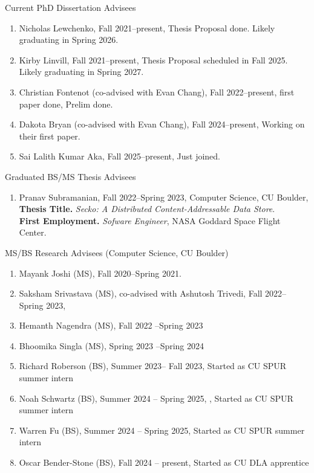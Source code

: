 \documentclass{article}
\begin{document}
\vspace{1em}
\noindent Current PhD Dissertation Advisees 
\begin{enumerate}
  \item Nicholas Lewchenko, Fall 2021--present, Thesis Proposal done. Likely graduating in Spring 2026.
  \item Kirby Linvill, Fall 2021--present, Thesis Proposal scheduled in
  Fall 2025. Likely graduating in Spring 2027. 
  \item Christian Fontenot (co-advised with Evan Chang), Fall 2022–present,
  first paper done, Prelim done. 
  \item Dakota Bryan (co-advised with Evan Chang), Fall 2024–present,
  Working on their first paper.
  \item Sai Lalith Kumar Aka, Fall 2025--present, Just joined. 
\end{enumerate}

\noindent Graduated BS/MS Thesis Advisees
\begin{enumerate}
\item Pranav Subramanian, Fall 2022--Spring 2023,
Computer Science, CU Boulder,\\
{\bf Thesis Title.} {\em Secko: A Distributed
Content-Addressable Data Store}. \\{\bf First Employment.} {\it Sofware Engineer},
NASA Goddard Space Flight Center. 
\end{enumerate}


\noindent MS/BS Research Advisees (Computer Science, CU Boulder)
\begin{enumerate}
  \item Mayank Joshi (MS), Fall 2020--Spring 2021.
  \item Saksham Srivastava (MS), co-advised with Ashutosh Trivedi, Fall
  2022--Spring 2023,  
  \item Hemanth Nagendra (MS), Fall 2022 --Spring 2023 
  \item Bhoomika Singla (MS), Spring 2023 --Spring 2024 
  \item Richard Roberson (BS), Summer 2023-- Fall 2023, Started as CU SPUR summer intern
  \item Noah Schwartz (BS), Summer 2024 -- Spring 2025, , Started as CU SPUR summer intern
  \item Warren Fu (BS), Summer 2024 -- Spring 2025, Started as CU SPUR summer intern
  \item Oscar Bender-Stone (BS), Fall 2024 -- present, Started as CU DLA apprentice
\end{enumerate}
\end{document}
